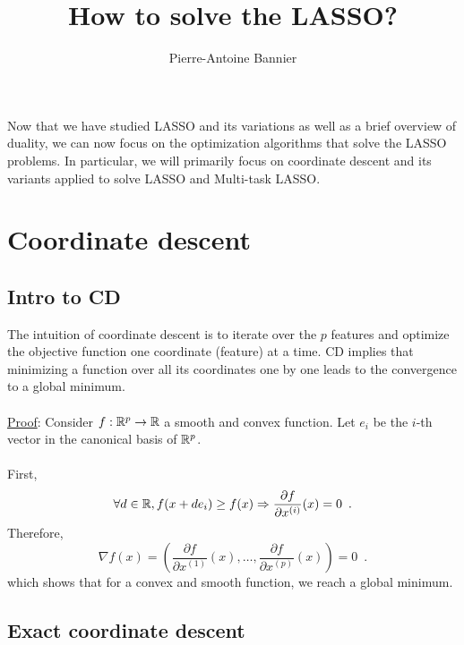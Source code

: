 \documentclass[a4paper,10pt]{article}
\author{Pierre-Antoine Bannier}
\title{How to solve the LASSO?}
\theoremstyle{definition}
\begin{document}
\maketitle

\vskip 0.3in

Now that we have studied LASSO and its variations as well as a brief overview of 
duality, we can now focus on the optimization algorithms that solve the LASSO problems.
In particular, we will primarily focus on coordinate descent and its variants applied 
to solve LASSO and Multi-task LASSO. 



\section*{Coordinate descent}
\label{section_1}

\subsection*{Intro to CD}

The intuition of coordinate descent is to iterate over the $p$ features and optimize the
objective function one coordinate (feature) at a time. CD implies that minimizing a function
over all its coordinates one by one leads to the convergence to a global minimum.
\\
\\
\underline{Proof}: Consider $f : \mathbb{R}^p \rightarrow \mathbb{R}$ a smooth and convex function.
Let $e_i$ be the $i$-th vector in the canonical basis of $\mathbb{R}^p$. 
\\
\\
First, 
\begin{equation*}
    \forall d \in \mathbb{R}, f(x + de_i) \geq f(x) 
    \Rightarrow 
    \frac{\partial f}{\partial x^{(i)}}(x) = 0
    \enspace .
\end{equation*}
%
Therefore,
\begin{equation*}
    \nabla f(x) = \left(
        \frac{\partial f}{\partial x^{(1)}}(x),
        \dots,
        \frac{\partial f}{\partial x^{(p)}}(x)
    \right) = 0
    \enspace .
\end{equation*}
%
which shows that for a convex and smooth function, we reach a global minimum.

\subsection*{Exact coordinate descent}
\end{document}
